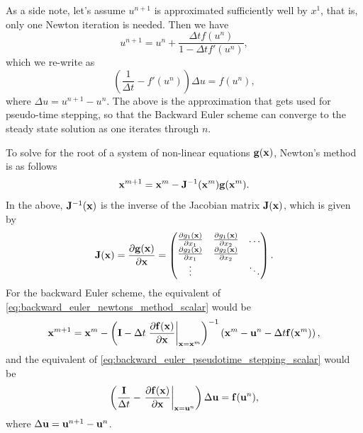 \documentclass[oneside,a4paper,11pt]{report}
\begin{document}
As a side note, let's assume $u^{n+1}$ is approximated sufficiently well by $x^1$, that is, only one Newton iteration is needed. Then we have
\begin{equation}
    u^{n+1} = u^n + \frac{\Delta t f(u^n)}{1 - \Delta t f'(u^n)}, 
\end{equation}
which we re-write as
\begin{equation}
\label{eq:backward_euler_pseudotime_stepping_scalar}
    \left ( \frac{1}{\Delta t} - f'(u^n) \right ) \Delta u = f(u^n),
\end{equation}
where $\Delta u = u^{n+1} - u^n$. The above is the approximation that gets used for pseudo-time stepping, so that the Backward Euler scheme can converge to the steady state solution as one iterates through $n$.

To solve for the root of a system of non-linear equations $\mathbf{g}(\mathbf{x})$, Newton's method is as follows
\begin{equation}
    \mathbf{x}^{m+1} = \mathbf{x}^m - \mathbf{J}^{-1}(\mathbf{x}^m) \mathbf{g}(\mathbf{x}^m). 
\end{equation}
In the above, $\mathbf{J}^{-1}(\mathbf{x})$ is the inverse of the Jacobian matrix $\mathbf{J}(\mathbf{x})$, which is given by
\begin{equation}
    \mathbf{J}(\mathbf{x}) = \frac{\partial \mathbf{g}(\mathbf{x})}{\partial \mathbf{x}} = \begin{pmatrix} 
    \frac{\partial g_1(\mathbf{x})}{\partial x_1} & \frac{\partial g_1(\mathbf{x})}{\partial x_2} & \dots \\
    \frac{\partial g_2(\mathbf{x})}{\partial x_1} & \frac{\partial g_2(\mathbf{x})}{\partial x_2} & \\
    \vdots &        & \ddots
    \end{pmatrix}.
\end{equation}
For the backward Euler scheme, the equivalent of \cref{eq:backward_euler_newtons_method_scalar} would be
\begin{equation}
\label{eq:backward_euler_newtons_method_system}
    \mathbf{x}^{m+1} = \mathbf{x}^m - \left ( \mathbf{I} - \Delta t \left . \frac{\partial \mathbf{f}(\mathbf{x})}{\partial \mathbf{x}} \right |_{\mathbf{x} = \mathbf{x}^m} \right )^{-1} \left ( \mathbf{x}^m - \mathbf{u}^n - \Delta t \mathbf{f}(\mathbf{x}^m) \right ),
\end{equation}
and the equivalent of \cref{eq:backward_euler_pseudotime_stepping_scalar} would be
\begin{equation}
\label{eq:backward_euler_pseudotime_stepping_system}
    \left ( \frac{\mathbf{I}}{\Delta t} - \left . \frac{\partial \mathbf{f}(\mathbf{x})}{\partial \mathbf{x}} \right |_{\mathbf{x} = \mathbf{u}^n} \right ) \Delta \mathbf{u} = \mathbf{f}(\mathbf{u}^n),
\end{equation}
where $\Delta \mathbf{u} = \mathbf{u}^{n+1} - \mathbf{u}^n$.
\end{document}
